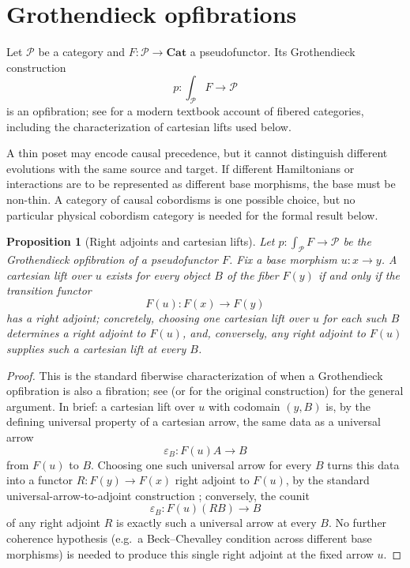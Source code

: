 \documentclass[11pt]{article}
\newtheorem{proposition}[theorem]{Proposition}
\begin{document}
\section{Grothendieck opfibrations}
\label{sec:opfibrations}

Let $\mathcal P$ be a category and $F:\mathcal P\to\mathbf{Cat}$ a
pseudofunctor. Its Grothendieck construction \cite{Grothendieck1971}
\[
p:\int_{\mathcal P}F\longrightarrow\mathcal P
\]
is an opfibration; see \cite{Jacobs1999} for a modern textbook account of
fibered categories, including the characterization of cartesian lifts used
below.

A thin poset may encode causal precedence, but it cannot distinguish
different evolutions with the same source and target. If different
Hamiltonians or interactions are to be represented as different base
morphisms, the base must be non-thin. A category of causal cobordisms is one
possible choice, but no particular physical cobordism category is needed for
the formal result below.

\begin{proposition}[Right adjoints and cartesian lifts]
\label{prop:groth-right-adjoint}
Let $p:\int_{\mathcal P}F\to\mathcal P$ be the Grothendieck opfibration of
a pseudofunctor $F$. Fix a base morphism $u:x\to y$. A cartesian lift over
$u$ exists for every object $B$ of the fiber $F(y)$ if and only if the
transition functor
\[
F(u):F(x)\longrightarrow F(y)
\]
has a right adjoint; concretely, choosing one cartesian lift over $u$ for
each such $B$ determines a right adjoint to $F(u)$, and, conversely, any
right adjoint to $F(u)$ supplies such a cartesian lift at every $B$.
\end{proposition}

\begin{proof}
This is the standard fiberwise characterization of when a Grothendieck
opfibration is also a fibration; see \cite{Jacobs1999} (or
\cite{Grothendieck1971} for the original construction) for the general
argument. In brief: a cartesian lift over $u$ with codomain $(y,B)$ is, by
the defining universal property of a cartesian arrow, the same data as a
universal arrow
\[
\varepsilon_B:F(u)A\to B
\]
from $F(u)$ to $B$. Choosing one such universal arrow for every $B$ turns
this data into a functor $R:F(y)\to F(x)$ right adjoint to $F(u)$, by the
standard universal-arrow-to-adjoint construction \cite{MacLane1998};
conversely, the counit
\[
\varepsilon_B:F(u)(RB)\to B
\]
of any right adjoint $R$ is exactly such a universal arrow at every $B$. No
further coherence hypothesis (e.g.\ a Beck--Chevalley condition across
different base morphisms) is needed to produce this single right adjoint at
the fixed arrow $u$.
\end{proof}
\end{document}
